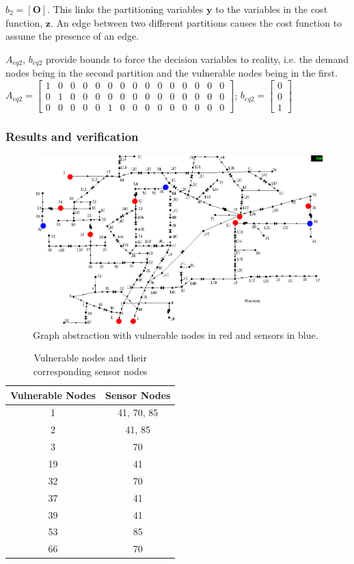 \documentclass[authoryear,preprint,review,12pt]{elsarticle}
\begin{document}
$b_{2}=\left[\mathbf{O}\right]$. This links the partitioning variables
$\mathbf{y}$ to the variables in the cost function, $\mathbf{z}$.
An edge between two different partitions causes the cost function
to assume the presence of an edge.

$A_{eq2}$, $b_{eq2}$ provide bounds to force the decision variables
to reality, i.e. the demand nodes being in the second partition and the vulnerable nodes being in the first. \\

$A_{eq2}=\left[\begin{array}{ccccccccccccccc}
1 & 0 & 0 & 0 & 0 & 0 & 0 & 0 & 0 & 0 & 0 & 0 & 0 & 0 & 0\\
0 & 1 & 0 & 0 & 0 & 0 & 0 & 0 & 0 & 0 & 0 & 0 & 0 & 0 & 0\\
0 & 0 & 0 & 0 & 0 & 1 & 0 & 0 & 0 & 0 & 0 & 0 & 0 & 0 & 0
\end{array}\right]$; $b_{eq2}=\left[\begin{array}{c}
0\\
0\\
1
\end{array}\right]$\\


\subsubsection*{Results and verification}

\begin{figure}[h]
\includegraphics[scale=0.4]{images/netowrkSensorsOnly}\caption{Graph abstraction with vulnerable nodes in red and sensors in blue.}
\end{figure}


\begin{table}[h]
\centering{}%
\begin{tabular}{|c|c|}
\hline
Vulnerable Nodes & Sensor Nodes\tabularnewline
\hline
\hline
1 & 41, 70, 85\tabularnewline
\hline
2 & 41, 85\tabularnewline
\hline
3 & 70\tabularnewline
\hline
19 & 41\tabularnewline
\hline
32 & 70\tabularnewline
\hline
37 & 41\tabularnewline
\hline
39 & 41\tabularnewline
\hline
53 & 85\tabularnewline
\hline
66 & 70\tabularnewline
\hline
\end{tabular}\caption{Vulnerable nodes and their corresponding sensor nodes}
\end{table}
\end{document}
